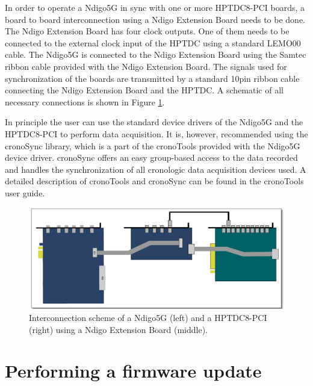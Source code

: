         In order to operate a Ndigo5G in sync with one or more HPTDC8-PCI boards, a board to board interconnection using a Ndigo Extension Board needs to be done. The Ndigo Extension Board has four clock outputs. One of them needs to be connected to the external clock input of the HPTDC using a standard LEMO00 cable. The Ndigo5G is connected to the Ndigo Extension Board using the Samtec ribbon cable provided with the Ndigo Extension Board. The signals used for synchronization of the boards are transmitted by a standard 10pin ribbon cable connecting the Ndigo Extension Board and the HPTDC. A schematic of all necessary connections is shown in Figure \ref{fig:InterconNdigo}.\par

        In principle the user can use the standard device drivers of the Ndigo5G and the HPTDC8-PCI to perform data acquisition. It is, however, recommended using the cronoSync library, which is a part of the cronoTools provided with the Ndigo5G device driver. cronoSync offers an easy group-based access to the data recorded and handles the synchronization of all cronologic data acquisition devices used. A detailed description of cronoTools and cronoSync can be found in the cronoTools user guide.

        \begin{figure}[hb]
            \begin{center}
                \includegraphics[width=\textwidth]{figures/InterconNdigo.pdf}
                \caption{\label{fig:InterconNdigo} Interconnection scheme of a Ndigo5G (left) and a HPTDC8-PCI (right) using a Ndigo Extension Board (middle).}
            \end{center}
        \end{figure}

    \section{Performing a firmware update}

